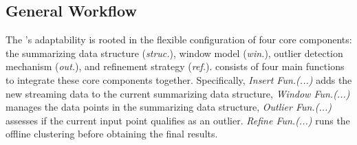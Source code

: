 \subsection{General Workflow}
\label{subsec:workflow}
The \algo's adaptability is rooted in the flexible configuration of four core components: the summarizing data structure (\textit{struc.}), window model (\textit{win.}), outlier detection mechanism (\textit{out.}), and refinement strategy (\textit{ref.}). \algo consists of four main functions to integrate these core components together. Specifically,
\emph{Insert Fun.(...)} adds the new streaming data to the current summarizing data structure, \emph{Window Fun.(...)} manages the data points in the summarizing data structure, \emph{Outlier Fun.(...)} assesses if the current input point qualifies as an outlier. \emph{Refine Fun.(...)} runs the offline clustering before obtaining the final results.


